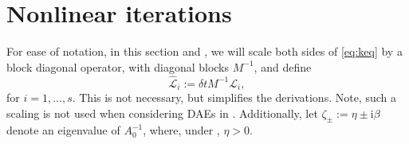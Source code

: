 \documentclass[review]{siamart}
\makeatletter
\newcommand{\todo}[1]{\textcolor{red}{[TODO\@: #1]}}
\makeatother
\begin{document}
\section{Nonlinear iterations}\label{sec:nonlinear}

For ease of notation, in this section and , we will scale
both sides of \eqref{eq:keq} by a block diagonal operator, with diagonal
blocks $M^{-1}$, and define
%
\begin{equation*}
\widehat{\mathcal{L}}_i := \delta t M^{-1}\mathcal{L}_i,
\end{equation*}
%
for $i=1,...,s$. This is not necessary, but simplifies the derivations. Note,
such a scaling is not used when considering DAEs in .
Additionally, let $\zeta_{\pm} := \eta \pm \mathrm{i}\beta$ denote an
eigenvalue of $A_0^{-1}$, where, under , $\eta > 0$.


\end{document}
